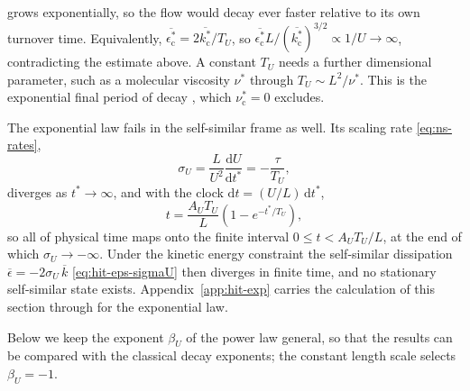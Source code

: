 \documentclass{article}
\begin{document}
grows exponentially, so the flow would decay ever faster relative to its own
turnover time. Equivalently,
$\overline{\epsilon_{\mathrm{c}}^*} = 2\overline{k_{\mathrm{c}}^*}/T_U$, so
$\overline{\epsilon_{\mathrm{c}}^*} L / (\overline{k_{\mathrm{c}}^*})^{3/2}
\propto 1/U \to \infty$, contradicting the estimate above. A constant $T_U$
needs a further dimensional parameter, such as a molecular viscosity
$\nu^*$ through $T_U \sim L^2/\nu^*$. This is the exponential final period of
decay \cite{pope2000turbulent}, which $\nu_{\mathrm{c}}^* = 0$ excludes.
\par
The exponential law fails in the self-similar frame as well. Its scaling
rate \eqref{eq:ns-rates},
\begin{equation}
  \sigma_U = \frac{L}{U^2}\frac{\mathrm{d} U}{\mathrm{d} t^*}
  = -\frac{\tau}{T_U} ,
\end{equation}
diverges as $t^* \to \infty$, and with the clock
$\mathrm{d}t = (U/L)\, \mathrm{d}t^*$,
\begin{equation}
  t = \frac{A_U T_U}{L}\left( 1 - e^{-t^*/T_U} \right) ,
\end{equation}
so all of physical time maps onto the finite interval
$0 \le t < A_U T_U / L$, at the end of which $\sigma_U \to -\infty$. Under
the kinetic energy constraint the self-similar dissipation
$\overline{\epsilon} = -2\sigma_U\, \overline{k}$ \eqref{eq:hit-eps-sigmaU}
then diverges in finite time, and no stationary self-similar state exists.
Appendix~\ref{app:hit-exp} carries the calculation of this section through
for the exponential law.
\par
Below we keep the exponent $\beta_U$ of the power law general, so that the
results can be compared with the classical decay exponents; the constant
length scale selects $\beta_U = -1$.
\end{document}
